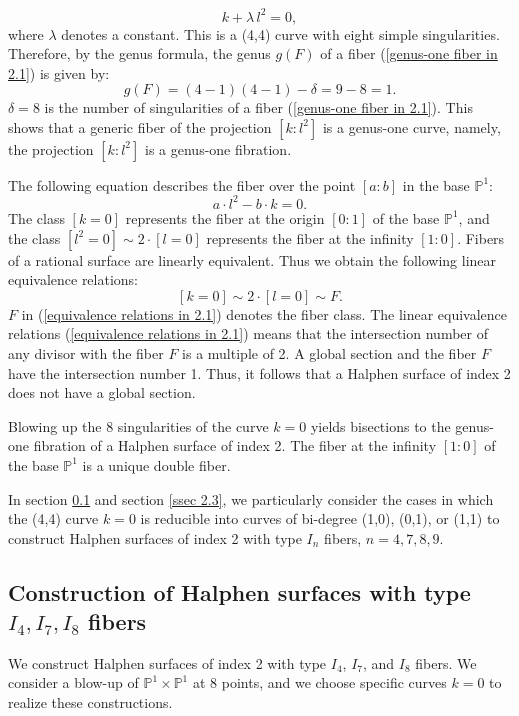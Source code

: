 \documentclass[12pt]{article}
\def\P{\mathbb{P}}
\begin{document}
\begin{equation}
\label{genus-one fiber in 2.1}
k+\lambda\, l^2=0,
\end{equation}
where $\lambda$ denotes a constant. This is a (4,4) curve with eight simple singularities. Therefore, by the genus formula, the genus $g(F)$ of a fiber (\ref{genus-one fiber in 2.1}) is given by: 
\begin{equation}
g(F)=(4-1)(4-1)-\delta=9-8=1.
\end{equation}
$\delta=8$ is the number of singularities of a fiber (\ref{genus-one fiber in 2.1}). This shows that a generic fiber of the projection $[k:l^2]$ is a genus-one curve, namely, the projection $[k:l^2]$ is a genus-one fibration. 
\par The following equation describes the fiber over the point $[a:b]$ in the base $\P^1$:
\begin{equation}
a\cdot l^2-b\cdot k=0.
\end{equation}
The class $[k=0]$ represents the fiber at the origin $[0:1]$ of the base $\P^1$, and the class $[l^2=0] \sim 2\cdot [l=0]$ represents the fiber at the infinity $[1:0]$. Fibers of a rational surface are linearly equivalent. Thus we obtain the following linear equivalence relations: 
\begin{equation}
\label{equivalence relations in 2.1}
[k=0] \sim 2\cdot [l=0] \sim F.
\end{equation}
$F$ in (\ref{equivalence relations in 2.1}) denotes the fiber class. The linear equivalence relations (\ref{equivalence relations in 2.1}) means that the intersection number of any divisor with the fiber $F$ is a multiple of 2. A global section and the fiber $F$ have the intersection number 1. Thus, it follows that a Halphen surface of index 2 does not have a global section. 
\par Blowing up the 8 singularities of the curve $k=0$ yields bisections to the genus-one fibration of a Halphen surface of index 2. The fiber at the infinity $[1:0]$ of the base $\P^1$ is a unique double fiber. 
\par In section \ref{ssec 2.2} and section \ref{ssec 2.3}, we particularly consider the cases in which the (4,4) curve $k=0$ is reducible into curves of bi-degree (1,0), (0,1), or (1,1) to construct Halphen surfaces of index 2 with type $I_n$ fibers, $n=4,7,8,9$. 

\subsection{Construction of Halphen surfaces with type $I_4, I_7, I_8$ fibers}
\label{ssec 2.2}
We construct Halphen surfaces of index 2 with type $I_4$, $I_7$, and $I_8$ fibers. We consider a blow-up of $\P^1\times\P^1$ at 8 points, and we choose specific curves $k=0$ to realize these constructions.
\end{document}
